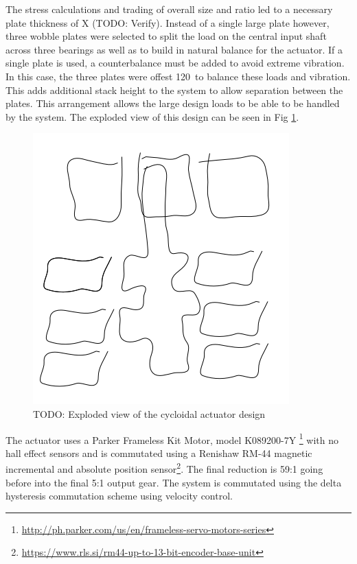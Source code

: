 \documentclass[letterpaper, 10 pt, conference]{ieeeconf}  %
\begin{document}
The stress calculations and trading of overall size and ratio led to a necessary plate thickness of X (TODO: Verify). Instead of a single large plate however, three wobble plates were selected to split the load on the central input shaft across three bearings as well as to build in natural balance for the actuator. If a single plate is used, a counterbalance must be added to avoid extreme vibration. In this case, the three plates were offest 120\textdegree\ to balance these loads and vibration. This adds additional stack height to the system to allow separation between the plates. This arrangement allows the large design loads to be able to be handled by the system. The exploded view of this design can be seen in Fig \ref{cycloid_exploded}. 

   \begin{figure}[t]
      \centering
      \includegraphics[width=0.75\linewidth]{actuator_layout_cartoon}
      \caption{TODO: Exploded view of the cycloidal actuator design}
      \label{cycloid_exploded}
   \end{figure}

The actuator uses a Parker Frameless Kit Motor, model K089200-7Y \footnote{\url{http://ph.parker.com/us/en/frameless-servo-motors-series}} with no hall effect sensors and is commutated using a Renishaw RM-44 magnetic incremental and absolute position sensor\footnote{\url{https://www.rls.si/rm44-up-to-13-bit-encoder-base-unit}}. The final reduction is 59:1 going before into the final 5:1 output gear. The system is commutated using the delta hysteresis commutation scheme \cite{electric_machines} using velocity control. 
\end{document}
